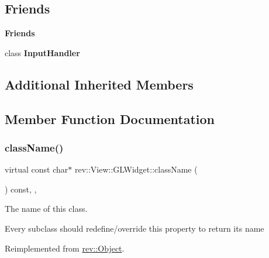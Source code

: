 \subsection*{Friends}
\begin{Indent}\textbf{ Friends}\par
\begin{DoxyCompactItemize}
\item 
\mbox{\label{classrev_1_1_view_1_1_g_l_widget_a28c677eee06763681231ba62273b9fad}} 
class {\bfseries Input\+Handler}
\end{DoxyCompactItemize}
\end{Indent}
\subsection*{Additional Inherited Members}


\subsection{Member Function Documentation}
\mbox{\label{classrev_1_1_view_1_1_g_l_widget_a223f5d2a14ae6e2d3c988d008710e5fc}} 
\subsubsection{\texorpdfstring{className()}{className()}}
{\footnotesize\ttfamily virtual const char$\ast$ rev\+::\+View\+::\+G\+L\+Widget\+::class\+Name (\begin{DoxyParamCaption}{ }\end{DoxyParamCaption}) const\hspace{0.3cm}{\ttfamily [inline]}, {\ttfamily [override]}, {\ttfamily [virtual]}}



The name of this class. 

Every subclass should redefine/override this property to return its name 

Reimplemented from \mbox{\hyperlink{classrev_1_1_object_a7a2013f91169479b65cf93afdc5d9a68}{rev\+::\+Object}}.

\mbox{\label{classrev_1_1_view_1_1_g_l_widget_a5ddbef17b0b7385faed69d79af3799e6}} 
